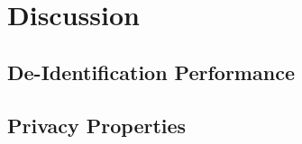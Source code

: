 
\section{Discussion}\label{sec:discussion}

\subsection{De-Identification Performance}

\subsection{Privacy Properties}

